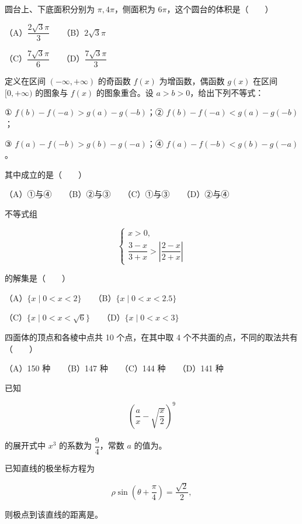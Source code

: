 \begin{question}
圆台上、下底面积分别为 $\pi,4\pi$，侧面积为 $6\pi$，这个圆台的体积是\mbox{（　　）}

（A）$\dfrac{2\sqrt3\pi}{3}$　　（B）$2\sqrt3\pi$

（C）$\dfrac{7\sqrt3\pi}{6}$　　（D）$\dfrac{7\sqrt3\pi}{3}$

\end{question}
\begin{question}
定义在区间 $(-\infty,+\infty)$ 的奇函数 $f(x)$ 为增函数，偶函数 $g(x)$ 在区间 $[0,+\infty)$ 的图象与 $f(x)$ 的图象重合。设 $a>b>0$，给出下列不等式：

① $f(b)-f(-a)>g(a)-g(-b)$；② $f(b)-f(-a)<g(a)-g(-b)$；

③ $f(a)-f(-b)>g(b)-g(-a)$；④ $f(a)-f(-b)<g(b)-g(-a)$。

其中成立的是\mbox{（　　）}

（A）①与④　　（B）②与③　　（C）①与③　　（D）②与④

\end{question}
\begin{question}
不等式组

\nopagebreak[4]
\[
\begin{cases}
x>0,\\[2pt]
\dfrac{3-x}{3+x}>\left|\dfrac{2-x}{2+x}\right|
\end{cases}
\]

的解集是\mbox{（　　）}

（A）$\{x\mid0<x<2\}$　　（B）$\{x\mid0<x<2.5\}$

（C）$\{x\mid0<x<\sqrt6\}$　　（D）$\{x\mid0<x<3\}$

\end{question}
\begin{question}
四面体的顶点和各棱中点共 10 个点，在其中取 4 个不共面的点，不同的取法共有\mbox{（　　）}

（A）150 种　　（B）147 种　　（C）144 种　　（D）141 种

\end{question}
\begin{question}
已知

\nopagebreak[4]
\[
\left(\dfrac ax-\sqrt{\dfrac x2}\right)^9
\]

的展开式中 $x^3$ 的系数为 $\dfrac94$，常数 $a$ 的值为\gkblank{}。

\end{question}
\begin{question}
已知直线的极坐标方程为

\nopagebreak[4]
\[
\rho\sin\left(\theta+\dfrac\pi4\right)=\dfrac{\sqrt2}{2},
\]

则极点到该直线的距离是\gkblank{}。

\end{question}
